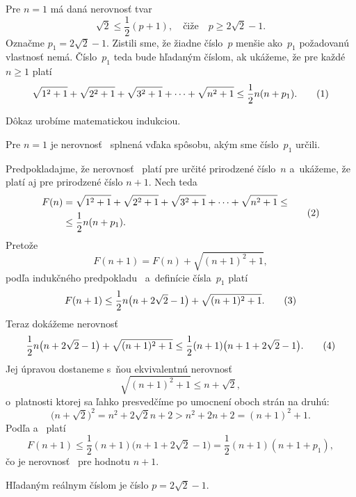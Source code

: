 {%
\def\cl#1{\sqrt{#1^2+1}}%
Pre $n=1$ má daná nerovnosť tvar
$$
\sqrt2\le\frac12(p+1),\quad\text{čiže}\quad
p\geq2\sqrt2-1.
$$
Označme $p_1=2\sqrt2-1$. Zistili sme, že žiadne číslo~$p$ menšie
ako~$p_1$ požadovanú vlastnosť nemá. Číslo~$p_1$ teda bude hľadaným
číslom, ak ukážeme, že pre každé $n\ge1$ platí
$$
\cl1+\cl2+\cl3+\cdots+\cl{n}\leq\frac12 n(n+p_1).\tag1
$$

Dôkaz urobíme matematickou indukciou.

Pre $n=1$ je nerovnosť~ splnená vďaka spôsobu,
akým sme číslo~$p_1$ určili.

 Predpokladajme, že nerovnosť~ platí pre určité
prirodzené číslo~$n$ a~ukážeme, že platí aj pre prirodzené číslo
$n+1$. Nech teda
$$
\aligned
F(n)&=\cl1+\cl2+\cl3+\cdots+\cl{n}\le\\
    &\leq\frac12 n(n+p_1).
\endaligned                             \tag2
$$
Pretože
$$
F(n+1)= F(n)+\cl{(n+1)},
$$
podľa indukčného predpokladu~ a~definície čísla~$p_1$ platí
$$
F(n+1)\leq \frac12 n\bigl(n+2\sqrt2-1\bigr)+\cl{(n+1)}.\tag3
$$
Teraz dokážeme nerovnosť
$$
\frac12
n\bigl(n+2\sqrt2-1\bigr)+\cl{(n+1)}\leq\frac12(n+1)\bigl(n+1+2\sqrt2-1\bigr).
\tag4
$$
Jej úpravou dostaneme s~ňou ekvivalentnú nerovnosť
$$
\cl{(n+1)}\leq n+\sqrt2,
$$
o~platnosti ktorej sa ľahko presvedčíme po umocnení oboch
strán na druhú:
$$
\bigl(n+\sqrt2\bigr)^2=n^2+2\sqrt2n+2>n^2+2n+2=(n+1)^2+1.
$$
Podľa  a~ platí
$$
F(n+1)\leq \frac12(n+1)\bigl(n+1+2\sqrt2-1\bigr)=\frac12(n+1)(n+1+p_1),
$$
čo je nerovnosť~ pre hodnotu $n+1$.

\zaver
Hľadaným reálnym číslom je číslo $p=2\sqrt2-1$.}

